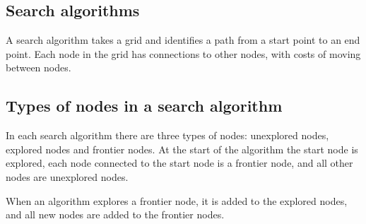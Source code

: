
\subsection{Search algorithms}

A search algorithm takes a grid and identifies a path from a start point to an end point. Each node in the grid has connections to other nodes, with costs of moving between nodes.

\subsection{Types of nodes in a search algorithm}

In each search algorithm there are three types of nodes: unexplored nodes, explored nodes and frontier nodes. At the start of the algorithm the start node is explored, each node connected to the start node is a frontier node, and all other nodes are unexplored nodes.

When an algorithm explores a frontier node, it is added to the explored nodes, and all new nodes are added to the frontier nodes.

